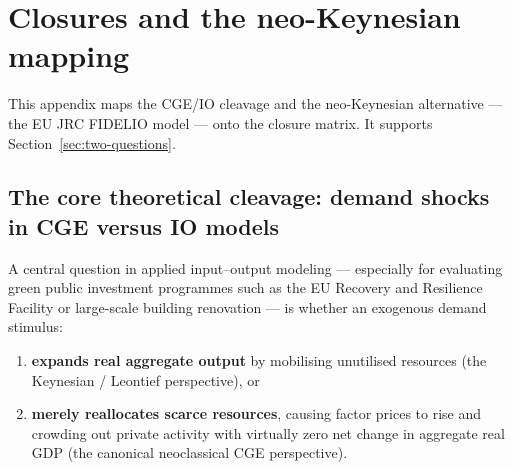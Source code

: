%
\section{Closures and the neo-Keynesian mapping}\label{app:mapping}

\noindent This appendix maps the CGE/IO cleavage and the neo-Keynesian
alternative --- the EU JRC FIDELIO model --- onto the closure matrix. It
supports Section~\ref{sec:two-questions}.

\subsection{The core theoretical cleavage: demand shocks in CGE versus IO models}\label{app:cleavage}

A central question in applied input--output modeling --- especially for
evaluating green public investment programmes such as the EU Recovery and
Resilience Facility or large-scale building renovation --- is whether an
exogenous demand stimulus:

\begin{enumerate}
\item \textbf{expands real aggregate output} by mobilising unutilised
  resources (the Keynesian / Leontief perspective), or
\item \textbf{merely reallocates scarce resources}, causing factor prices to
  rise and crowding out private activity with virtually zero net change in
  aggregate real GDP (the canonical neoclassical CGE perspective).
\end{enumerate}

